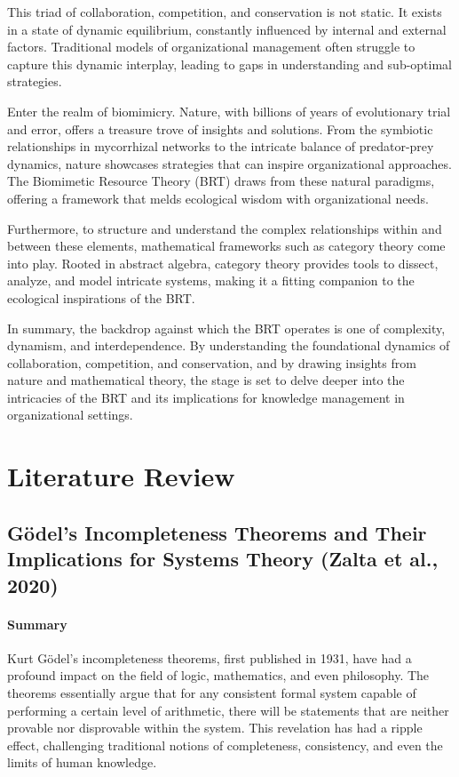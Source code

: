 \documentclass[sn-nature]{sn-jnl}%
\theoremstyle{thmstyleone}%
\theoremstyle{thmstyletwo}%
\theoremstyle{thmstylethree}%
\begin{document}
This triad of collaboration, competition, and conservation is not static. It exists in a state of dynamic equilibrium, constantly influenced by internal and external factors\cite{nash_equilibrium_1950}. Traditional models of organizational management often struggle to capture this dynamic interplay, leading to gaps in understanding and sub-optimal strategies\cite{nash_non-cooperative_1951}.

Enter the realm of biomimicry. Nature, with billions of years of evolutionary trial and error, offers a treasure trove of insights and solutions\cite{benyus_biomimicry_2009}. From the symbiotic relationships in mycorrhizal networks to the intricate balance of predator-prey dynamics, nature showcases strategies that can inspire organizational approaches\cite{fricker_mycelium_2017}\cite{horton_mycorrhizal_2015}\cite{guichard_meta-ecosystem_2021}. The Biomimetic Resource Theory (BRT) draws from these natural paradigms, offering a framework that melds ecological wisdom with organizational needs\cite{ujwary-gil_organizational_2020}.

Furthermore, to structure and understand the complex relationships within and between these elements, mathematical frameworks such as category theory come into play. Rooted in abstract algebra, category theory provides tools to dissect, analyze, and model intricate systems, making it a fitting companion to the ecological inspirations of the BRT\cite{spivak_category_2014}\cite{fong_invitation_2019}.

In summary, the backdrop against which the BRT operates is one of complexity, dynamism, and interdependence. By understanding the foundational dynamics of collaboration, competition, and conservation, and by drawing insights from nature and mathematical theory, the stage is set to delve deeper into the intricacies of the BRT and its implications for knowledge management in organizational settings.
\section{Literature Review}\label{sec3}
\subsection{Gödel's Incompleteness Theorems and Their Implications for Systems Theory (Zalta et al., 2020)\cite{zalta_gos_2020}}
\paragraph{Summary}
Kurt Gödel's incompleteness theorems, first published in 1931, have had a profound impact on the field of logic, mathematics, and even philosophy. The theorems essentially argue that for any consistent formal system capable of performing a certain level of arithmetic, there will be statements that are neither provable nor disprovable within the system. This revelation has had a ripple effect, challenging traditional notions of completeness, consistency, and even the limits of human knowledge.
\end{document}
